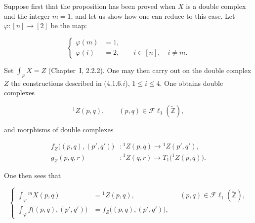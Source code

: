 \clearpage
{}%
\begingroup\small\setlength{\parskip}{0pt}\setlength{\emergencystretch}{1.5em}
\setlength{\abovedisplayskip}{4pt plus 2pt minus 2pt}%
\setlength{\belowdisplayskip}{4pt plus 2pt minus 2pt}%

Suppose first that the proposition has been proved when $X$ is a double
complex and the integer $m=1$, and let us show how one can reduce to this
case. Let $\varphi\colon[n]\longrightarrow[2]$ be the map:

\begin{equation}
\left\{
\begin{aligned}
\varphi(m)&=1,\\
\varphi(i)&=2,\qquad i\in[n],\quad i\neq m.
\end{aligned}
\right.
\tag{4.1.7.1}
\end{equation}

Set $\int_\varphi X=Z$ (Chapter~I, 2.2.2). One may then carry out on the
double complex $Z$ the constructions described in (4.1.6.$i$),
$1\leq i\leq4$. One obtains double complexes

\begin{equation}
{}^{1}\!Z(p,q),\qquad
(p,q)\in\mathcal{F}\ell_1(\widetilde{\mathbb Z}),
\tag{4.1.7.2}
\end{equation}

and morphisms of double complexes

\begin{equation}
\begin{aligned}
f_Z\bigl((p,q),(p',q')\bigr)&\colon
{}^{1}\!Z(p,q)\longrightarrow{}^{1}\!Z(p',q'),\\
g_Z(p,q,r)&\colon
{}^{1}\!Z(q,r)\longrightarrow T_1\bigl({}^{1}\!Z(p,q)\bigr).
\end{aligned}
\tag{4.1.7.3}
\end{equation}

One then sees that

\begin{equation}
\left\{
\begin{aligned}
\int_\varphi{}^{m}\!X(p,q)
  &={}^{1}\!Z(p,q),
  &&(p,q)\in\mathcal{F}\ell_1(\widetilde{\mathbb Z}),\\
\int_\varphi f\bigl((p,q),(p',q')\bigr)
  &=f_Z\bigl((p,q),(p',q')\bigr),
\end{aligned}
\right.
\tag{4.1.7.4}
\end{equation}


